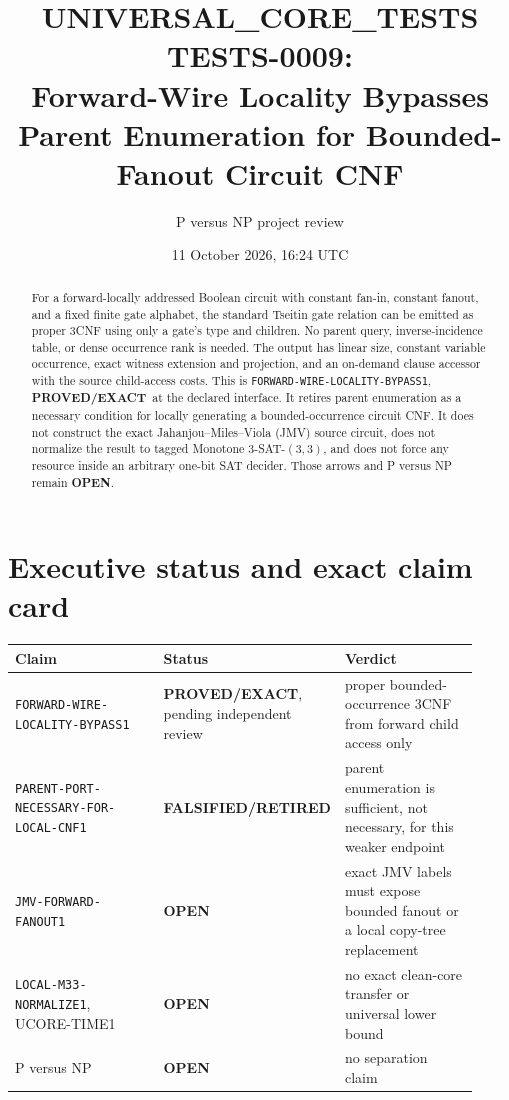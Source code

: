 \documentclass[11pt]{article}
\title{UNIVERSAL\_CORE\_TESTS TESTS-0009:\\
Forward-Wire Locality Bypasses Parent Enumeration for Bounded-Fanout Circuit CNF}
\author{P versus NP project review}
\date{11 October 2026, 16:24 UTC}
\newcommand{\EXACT}{\textbf{PROVED/EXACT}}
\newcommand{\OPEN}{\textbf{OPEN}}
\newcommand{\RETIRED}{\textbf{FALSIFIED/RETIRED}}
\begin{document}
\maketitle

\begin{abstract}
For a forward-locally addressed Boolean circuit with constant fan-in,
constant fanout, and a fixed finite gate alphabet, the standard Tseitin
gate relation can be emitted as proper 3CNF using only a gate's type and
children.  No parent query, inverse-incidence table, or dense occurrence
rank is needed.  The output has linear size, constant variable occurrence,
exact witness extension and projection, and an on-demand clause accessor
with the source child-access costs.  This is
\texttt{FORWARD-WIRE-LOCALITY-BYPASS1}, \EXACT\ at the declared interface.
It retires parent enumeration as a necessary condition for locally
generating a bounded-occurrence circuit CNF.  It does not construct the
exact Jahanjou--Miles--Viola (JMV) source circuit, does not normalize the
result to tagged Monotone 3-SAT-$(3,3)$, and does not force any resource
inside an arbitrary one-bit SAT decider.  Those arrows and P versus NP
remain \OPEN.
\end{abstract}

\section{Executive status and exact claim card}

\begin{center}\footnotesize
\begin{tabular}{@{}p{0.39\linewidth}p{0.19\linewidth}p{0.34\linewidth}@{}}
\toprule
Claim & Status & Verdict\\ \midrule
\texttt{FORWARD-WIRE-LOCALITY-BYPASS1} & \EXACT, pending independent review & proper bounded-occurrence 3CNF from forward child access only\\
\texttt{PARENT-PORT-NECESSARY-FOR-LOCAL-CNF1} & \RETIRED & parent enumeration is sufficient, not necessary, for this weaker endpoint\\
\texttt{JMV-FORWARD-FANOUT1} & \OPEN & exact JMV labels must expose bounded fanout or a local copy-tree replacement\\
\texttt{LOCAL-M33-NORMALIZE1}, UCORE-TIME1 & \OPEN & no exact clean-core transfer or universal lower bound\\
P versus NP & \OPEN & no separation claim\\
\bottomrule
\end{tabular}
\end{center}
\end{document}
